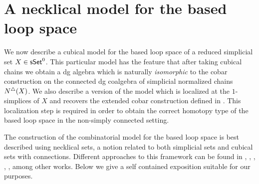 \section{A necklical model for the based loop space}

We now describe a cubical model for the based loop space of a reduced simplicial set $X \in \mathsf{sSet}^0$. This particular model has the feature that after taking cubical chains we obtain a dg algebra which is naturally \textit{isomorphic} to the cobar construction on the connected dg coalgebra of simplicial normalized chains $N^{\triangle}(X)$. We also describe a version of the model which is localized at the $1$-simplices of $X$ and recovers the extended cobar construction defined in \cite{Hess-Tonks}. This localization step is required in order to obtain the correct homotopy type of the based loop space in the non-simply connected setting.

The construction of the combinatorial model for the based loop space is best described using necklical sets, a notion related to both simplicial sets and cubical sets with connections. Different approaches to this framework can be found in \cite{Baues}, \cite{Galvez-Kaufmann-Tonks}, \cite{Dugger-Spivak}, \cite{rivera-zeinalian-cubical}, \cite{Rivera-Saneblidze}, among other works. Below we give a self contained exposition suitable for our purposes. 



